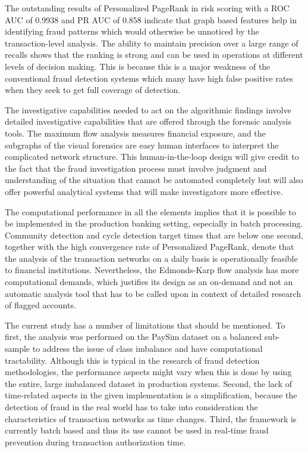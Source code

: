 \documentclass[lettersize,journal]{IEEEtran}
\begin{document}
The outstanding results of Personalized PageRank in risk scoring with a ROC AUC of 0.9938 and PR AUC of 0.858 indicate that graph based features help in identifying fraud patterns which would otherwise be unnoticed by the transaction-level analysis. The ability to maintain precision over a large range of recalls shows that the ranking is strong and can be used in operations at different levels of decision making. This is because this is a major weakness of the conventional fraud detection systems which many have high false positive rates when they seek to get full coverage of detection.


The investigative capabilities needed to act on the algorithmic findings involve detailed investigative capabilities that are offered through the forensic analysis tools. The maximum flow analysis measures financial exposure, and the subgraphs of the visual forensics are easy human interfaces to interpret the complicated network structure. This human-in-the-loop design will give credit to the fact that the fraud investigation process must involve judgment and understanding of the situation that cannot be automated completely but will also offer powerful analytical systems that will make investigators more effective.

The computational performance in all the elements implies that it is possible to be implemented in the production banking setting, especially in batch processing. Community detection and cycle detection target times that are below one second, together with the high convergence rate of Personalized PageRank, denote that the analysis of the transaction networks on a daily basis is operationally feasible to financial institutions. Nevertheless, the Edmonds-Karp flow analysis has more computational demands, which justifies its design as an on-demand and not an automatic analysis tool that has to be called upon in context of detailed research of flagged accounts.

The current study has a number of limitations that should be mentioned. To first, the analysis was performed on the PaySim dataset on a balanced sub-sample to address the issue of class imbalance and have computational tractability. Although this is typical in the research of fraud detection methodologies, the performance aspects might vary when this is done by using the entire, large imbalanced dataset in production systems. Second, the lack of time-related aspects in the given implementation is a simplification, because the detection of fraud in the real world has to take into consideration the characteristics of transaction networks as time changes. Third, the framework is currently batch based and thus its use cannot be used in real-time fraud prevention during transaction authorization time.
\end{document}
